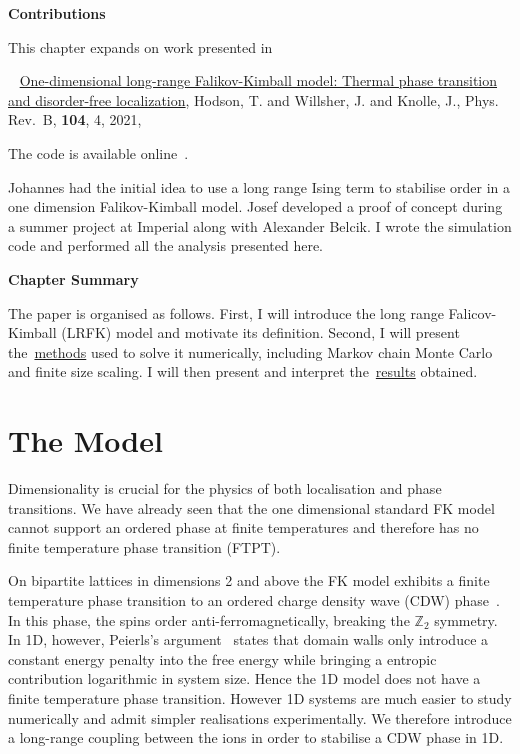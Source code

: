 \textbf{Contributions}

This chapter expands on work presented in

~\autocite{hodsonOnedimensionalLongrangeFalikovKimball2021} \href{https://link.aps.org/doi/10.1103/PhysRevB.104.045116}{One-dimensional long-range Falikov-Kimball model: Thermal phase transition and disorder-free localization}, Hodson, T. and Willsher, J. and Knolle, J., Phys. Rev.~B, \textbf{104}, 4, 2021,

The code is available online~\autocite{hodsonMCMCFKModel2021}.

Johannes had the initial idea to use a long range Ising term to stabilise order in a one dimension Falikov-Kimball model. Josef developed a proof of concept during a summer project at Imperial along with Alexander Belcik. I wrote the simulation code and performed all the analysis presented here.

\textbf{Chapter Summary}

The paper is organised as follows. First, I will introduce the long range Falicov-Kimball (LRFK) model and motivate its definition. Second, I will present the~\protect\hyperlink{sec:lrfk-methods}{methods} used to solve it numerically, including Markov chain Monte Carlo and finite size scaling. I will then present and interpret the~\protect\hyperlink{sec:lrfk-results}{results} obtained.

\hypertarget{sec:lrfk-model}{%
\section{The Model}\label{sec:lrfk-model}}

Dimensionality is crucial for the physics of both localisation and phase transitions. We have already seen that the one dimensional standard FK model cannot support an ordered phase at finite temperatures and therefore has no finite temperature phase transition (FTPT).

On bipartite lattices in dimensions 2 and above the FK model exhibits a finite temperature phase transition to an ordered charge density wave (CDW) phase~\autocite{maskaThermodynamicsTwodimensionalFalicovKimball2006}. In this phase, the spins order anti-ferromagnetically, breaking the \(\mathbb{Z}_2\) symmetry. In 1D, however, Peierls's argument~\autocite{peierlsIsingModelFerromagnetism1936,kennedyItinerantElectronModel1986} states that domain walls only introduce a constant energy penalty into the free energy while bringing a entropic contribution logarithmic in system size. Hence the 1D model does not have a finite temperature phase transition. However 1D systems are much easier to study numerically and admit simpler realisations experimentally. We therefore introduce a long-range coupling between the ions in order to stabilise a CDW phase in 1D.

